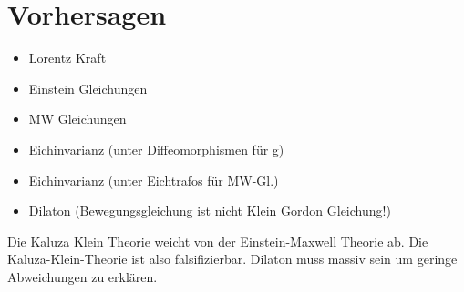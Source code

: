 \chapter{Vorhersagen}
\begin{itemize}
  \item Lorentz Kraft
  \item Einstein Gleichungen
  \item MW Gleichungen 
  \item Eichinvarianz (unter Diffeomorphismen für g)
  \item Eichinvarianz (unter Eichtrafos für MW-Gl.)
  \item Dilaton (Bewegungsgleichung ist nicht Klein Gordon Gleichung!)
\end{itemize}
Die Kaluza Klein Theorie weicht von der Einstein-Maxwell Theorie ab. Die
Kaluza-Klein-Theorie ist also falsifizierbar. 
Dilaton muss massiv sein um geringe Abweichungen zu erklären.
